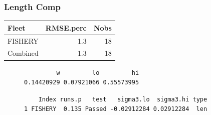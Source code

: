 \documentclass[
  letterpaper,
  DIV=11,
  numbers=noendperiod]{scrartcl}
\begin{document}
\hypertarget{length-comp}{%
\subsubsection{Length Comp}\label{length-comp}}

\begin{longtable}{lrr}
\toprule
Fleet & RMSE.perc & Nobs \\ 
\midrule
FISHERY & 1.3 & 18 \\ 
Combined & 1.3 & 18 \\ 
\bottomrule
\end{longtable}

\begin{figure}

\begin{minipage}[t]{0.50\linewidth}

{\centering 

\begin{verbatim}
         w         lo         hi 
0.14420929 0.07921066 0.55573995 
\end{verbatim}

}

\end{minipage}%
%
\begin{minipage}[t]{0.50\linewidth}

{\centering 

\begin{verbatim}
    Index runs.p   test   sigma3.lo  sigma3.hi type
1 FISHERY  0.135 Passed -0.02912284 0.02912284  len
\end{verbatim}

}

\end{minipage}%
\newline
\begin{minipage}[t]{0.50\linewidth}

{\centering 


}

\end{minipage}%

\end{figure}
\end{document}
